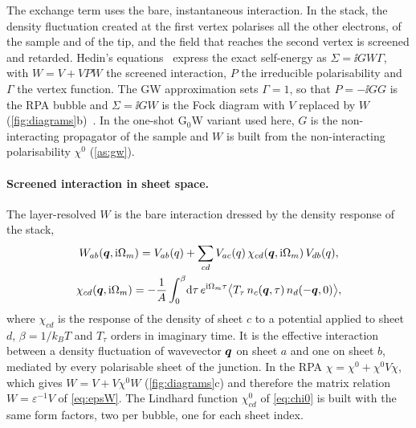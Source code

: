 The exchange term uses the bare, instantaneous interaction. In the stack, the density fluctuation created at
the first vertex polarises all the other electrons, of the sample and of the tip, and the field that reaches
the second vertex is screened and retarded. Hedin's equations~\cite{Hedin1965} express the exact self-energy
as $\Sigma=\ii GW\Gamma$, with $W=V+VPW$ the screened interaction, $P$ the irreducible polarisability and
$\Gamma$ the vertex function. The GW approximation sets $\Gamma=1$, so that $P=-\ii GG$ is the RPA bubble and
$\Sigma=\ii GW$ is the Fock diagram with $V$ replaced by $W$
(\cref{fig:diagrams}b)~\cite{Hedin1965,HybertsenLouie1986,AryasetiawanGunnarsson1998,Golze2019}. In the one-shot
G$_0$W variant used here, $G$ is the non-interacting propagator of the sample and $W$ is built from the
non-interacting polarisability $\chi^0$ (\cref{as:gw}).

\paragraph{Screened interaction in sheet space.} The layer-resolved $W$ is the bare interaction dressed by the
density response of the stack,
\begin{gather}
W_{ab}(\bm q,\mathrm i\Omega_m)=V_{ab}(q)+\sum_{cd}V_{ac}(q)\,\chi_{cd}(\bm q,\mathrm i\Omega_m)\,V_{db}(q),
\label{eq:Wdef}\\
\chi_{cd}(\bm q,\mathrm i\Omega_m)=-\frac1A\int_0^\beta\!\mathrm d\tau\,e^{\mathrm i\Omega_m\tau}\bigl\langle T_\tau\,n_c(\bm q,\tau)\,n_d(-\bm q,0)\bigr\rangle ,
\nonumber
\end{gather}
where $\chi_{cd}$ is the response of the density of sheet $c$ to a potential applied to sheet $d$, $\beta=1/k_BT$
and $T_\tau$ orders in imaginary time. It is the effective interaction between a density fluctuation of
wavevector $\bm q$ on sheet $a$ and one on sheet $b$, mediated by every polarisable sheet of the junction. In the
RPA $\chi=\chi^0+\chi^0V\chi$, which gives $W=V+V\chi^0W$ (\cref{fig:diagrams}c) and therefore the matrix
relation $W=\varepsilon^{-1}V$ of \cref{eq:epsW}. The Lindhard function $\chi^0_{cd}$ of \cref{eq:chi0} is built
with the same form factors, two per bubble, one for each sheet index.

